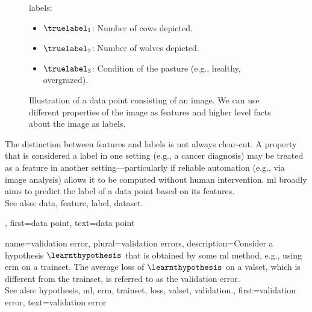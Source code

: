 {{\begin{figure}[H]
\begin{minipage}[t]{0.95\textwidth}
\begin{itemize}
			\end{itemize}
			\Glspl{label}:
            		\begin{itemize}
               	 		\item $\truelabel_{1}$: Number of cows depicted. 
                			\item $\truelabel_{2}$: Number of wolves depicted. 
                			\item $\truelabel_{3}$: Condition of the pasture (e.g., healthy, overgrazed).
            		\end{itemize}
    			\end{minipage}
    			\caption{Illustration of a \gls{data} point consisting of an image. We can use 
			different properties of the image as \glspl{feature} and higher level facts
			about the image as \glspl{label}.\label{fig:datapoint_cowherd_dict}}
		\end{figure}
 		The distinction between \glspl{feature} and \glspl{label} is not always clear-cut. 
 		A property that is considered a \gls{label} in one setting (e.g., a cancer diagnosis) 
 		may be treated as a \gls{feature} in another setting—particularly if reliable automation (e.g., 
 		via image analysis) allows it to be computed without human intervention.
   		\Gls{ml} broadly aims to predict the \gls{label} of a \gls{data} point based on its \glspl{feature}. 
				\\
		See also: \gls{data}, \gls{feature}, \gls{label}, \gls{dataset}.}, 
	first={data point},
	text={data point}  
}


{name={validation error}, plural={validation errors},
 	description={Consider a \gls{hypothesis} $\learnthypothesis$ that is 
 		obtained by some \gls{ml} method, e.g., using \gls{erm} on a \gls{trainset}. The average \gls{loss} 
 		of $\learnthypothesis$ on a \gls{valset}, which is different from the \gls{trainset}, is referred 
 		to as the \gls{validation} error.
			\\
		See also: \gls{hypothesis}, \gls{ml}, \gls{erm}, \gls{trainset}, \gls{loss}, \gls{valset}, \gls{validation}.},
	first={validation error},
	text={validation error}  
}

